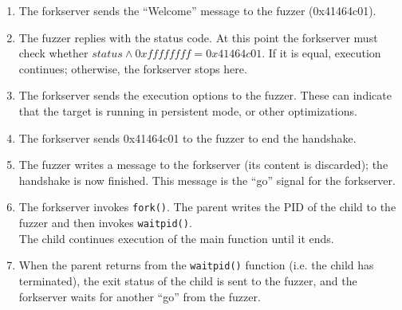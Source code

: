             \begin{enumerate}
                \item The forkserver sends the ``Welcome'' message to the fuzzer (0x41464c01).
                \item The fuzzer replies with the status code. At this point the forkserver must check whether $status \land 0xffffffff = 0x41464c01$.
                        If it is equal, execution continues; otherwise, the forkserver stops here.
                \item The forkserver sends the execution options to the fuzzer.
                    These can indicate that the target is running in persistent mode, or other optimizations.
                \item The forkserver sends 0x41464c01 to the fuzzer to end the handshake.
                \item The fuzzer writes a message to the forkserver (its content is discarded); the handshake is now finished.
                            This message is the ``go'' signal for the forkserver.
                \item The forkserver invokes \texttt{fork()}. The parent writes the PID of the child to the fuzzer and then invokes \texttt{waitpid()}.\\
                        The child continues execution of the main function until it ends.
                \item When the parent returns from the \texttt{waitpid()} function (i.e. the child has terminated), the exit status
                of the child is sent to the fuzzer, and the forkserver waits for another ``go'' from the fuzzer.
            \end{enumerate}
